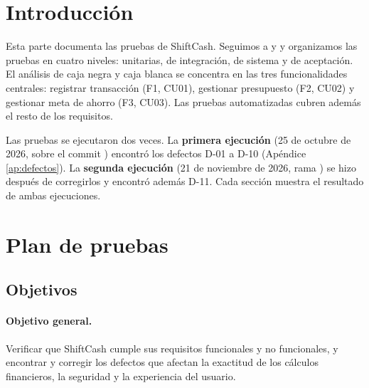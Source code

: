 \section{Introducción}

Esta parte documenta las pruebas de ShiftCash. Seguimos a \textcite{myers2011} y \textcite{pressman2010} y organizamos las pruebas en cuatro niveles: unitarias, de integración, de sistema y de aceptación. El análisis de caja negra y caja blanca se concentra en las tres funcionalidades centrales: registrar transacción (F1, CU01), gestionar presupuesto (F2, CU02) y gestionar meta de ahorro (F3, CU03). Las pruebas automatizadas cubren además el resto de los requisitos.

Las pruebas se ejecutaron dos veces. La \textbf{primera ejecución} (25 de octubre de 2026, sobre el commit ) encontró los defectos D-01 a D-10 (Apéndice \ref{ap:defectos}). La \textbf{segunda ejecución} (21 de noviembre de 2026, rama ) se hizo después de corregirlos y encontró además D-11. Cada sección muestra el resultado de ambas ejecuciones.

\section{Plan de pruebas}

\subsection{Objetivos}

\paragraph{Objetivo general.} Verificar que ShiftCash cumple sus requisitos funcionales y no funcionales, y encontrar y corregir los defectos que afectan la exactitud de los cálculos financieros, la seguridad y la experiencia del usuario.

